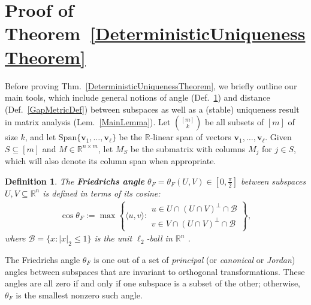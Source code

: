\documentclass[journal, twocolumn]{IEEEtran}
\newtheorem{definition}{Definition}
\begin{document}
\vspace{-.08 cm}

\section{Proof of Theorem~\ref{DeterministicUniquenessTheorem}}\label{DUT}
Before proving Thm.~\ref{DeterministicUniquenessTheorem}, we briefly outline our main tools, which include general notions of angle (Def.~\ref{FriedrichsDefinition}) and distance (Def.~\ref{GapMetricDef}) between subspaces as well as a (stable) uniqueness result in matrix analysis (Lem.~\ref{MainLemma}).
Let ${[m] \choose k}$ be all subsets of $[m]$ of size $k$, and let $\text{Span}\{\mathbf{v}_1, \ldots, \mathbf{v}_\ell\}$ be the $\mathbb{R}$-linear span of vectors $\mathbf{v}_1, \ldots, \mathbf{v}_\ell$. Given $S \subseteq [m]$ and $M \in \mathbb{R}^{n \times m}$, let $M_S$ be the submatrix with columns $M_j$ for $j \in S$, which will also denote its column span when appropriate.  

\begin{definition}\label{FriedrichsDefinition}
The \textbf{Friedrichs angle} $\theta_F = \theta_F(U,V) \in [0,\frac{\pi}{2}]$ between subspaces $U,V \subseteq \mathbb{R}^n$ is defined in terms of its cosine:
\begin{align*}
\cos{\theta_F} := \max\left\{ \langle u, v \rangle: \substack{ u \in U \cap (U \cap V)^\perp \cap \mathcal{B} \\ v \in V \cap (U \cap V)^\perp \cap \mathcal{B} } \right\},
\end{align*}
where $\mathcal{B} = \{ x: |x|_2 \leq 1\}$ is the unit $\ell_2$-ball in $\mathbb{R}^n$ \cite{Deutsch12}.
\end{definition}
The Friedrichs angle $\theta_F$ is one out of a set of \textit{principal} (or \textit{canonical} or \textit{Jordan}) angles between subspaces that are invariant to orthogonal transformations. These angles are all zero if and only if one subspace is a subset of the other; otherwise, $\theta_F$ is the smallest nonzero such angle. 
\end{document}
